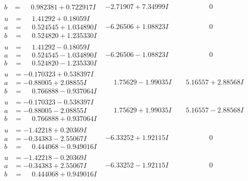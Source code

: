 \documentclass[1p]{elsarticle_modified}
\theoremstyle{definition}
\begin{document}
$$\begin{array}{c|c|c}
\begin{aligned}
b &= \phantom{-}0.982381 + 0.722917 I\end{aligned}
 & -2.71907 + 7.34999 I & \phantom{-0.000000 } 0 \\ \hline\begin{aligned}
u &= \phantom{-}1.41292 + 0.18059 I \\
a &= \phantom{-}0.524545 + 1.034890 I \\
b &= \phantom{-}0.524820 + 1.235330 I\end{aligned}
 & -6.26506 + 1.08823 I & \phantom{-0.000000 } 0 \\ \hline\begin{aligned}
u &= \phantom{-}1.41292 - 0.18059 I \\
a &= \phantom{-}0.524545 - 1.034890 I \\
b &= \phantom{-}0.524820 - 1.235330 I\end{aligned}
 & -6.26506 - 1.08823 I & \phantom{-0.000000 } 0 \\ \hline\begin{aligned}
u &= -0.170323 + 0.538397 I \\
a &= -0.88005 + 2.08855 I \\
b &= \phantom{-}0.766888 - 0.937064 I\end{aligned}
 & \phantom{-}1.75629 - 1.99035 I & \phantom{-}5.16557 + 2.88568 I \\ \hline\begin{aligned}
u &= -0.170323 - 0.538397 I \\
a &= -0.88005 - 2.08855 I \\
b &= \phantom{-}0.766888 + 0.937064 I\end{aligned}
 & \phantom{-}1.75629 + 1.99035 I & \phantom{-}5.16557 - 2.88568 I \\ \hline\begin{aligned}
u &= -1.42218 + 0.20369 I \\
a &= -0.34383 - 2.55067 I \\
b &= \phantom{-}0.444068 - 0.949016 I\end{aligned}
 & -6.33252 + 1.92115 I & \phantom{-0.000000 } 0 \\ \hline\begin{aligned}
u &= -1.42218 - 0.20369 I \\
a &= -0.34383 + 2.55067 I \\
b &= \phantom{-}0.444068 + 0.949016 I\end{aligned}
 & -6.33252 - 1.92115 I & \phantom{-0.000000 } 0 \\ \hline\begin{aligned}

\end{aligned}
\end{array}$$
\end{document}
